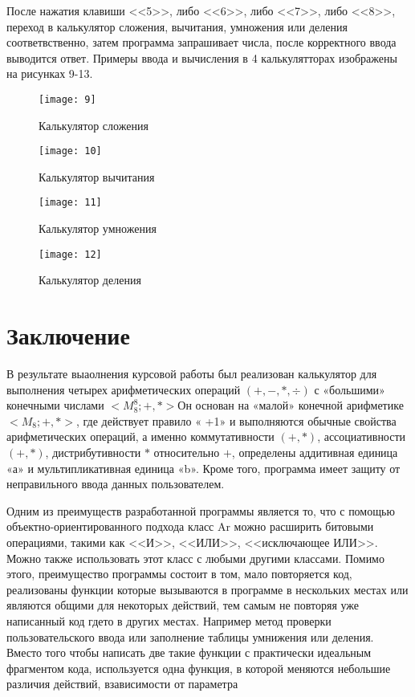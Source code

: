 \documentclass[10pt,a4paper,final]{article} %
\begin{document}
				После нажатия клавиши <<5>>, либо <<6>>, либо <<7>>, либо <<8>>, переход в калькулятор сложения, вычитания, умножения или деления соответвственно, затем программа запрашивает числа, после корректного ввода выводится ответ. Примеры ввода и вычисления в 4 калькулятторах изображены на рисунках 9-13.
			\begin{figure}[h!]
				\centering
				\texttt{[image: 9]}
				\caption{Калькулятор сложения}
					\texttt{[image: 10]}
				\caption{Калькулятор вычитания}
			\end{figure}	
			\newpage
			\begin{figure}[h!]
			\centering
			\texttt{[image: 11]}
			\caption{Калькулятор умножения}
				\texttt{[image: 12]}
			\caption{Калькулятор деления}
		\end{figure}	
		
		\newpage
		\section* {Заключение}
		
		
	
		


	
	В результате выаолнения курсовой работы был реализован калькулятор для выполнения четырех арифметических операций $(+, -, *, \div)$ с «большими» конечными числами $<M_{8}^{8} ;+, *>$Он основан на «малой» конечной арифметике $<M_{8};+, *>$, где действует правило « +1» и выполняются обычные свойства арифметических операций, а именно коммутативности $(+,*)$, ассоциативности $(+, *)$, дистрибутивности $*$ относительно $+$, определены аддитивная единица «а» и мультипликативная единица «b». Кроме того, программа имеет защиту от неправильного ввода данных пользователем.
	
	Одним из преимуществ разработанной программы является то, что с помощью объектно-ориентированного подхода класс Ar можно расширить битовыми операциями, такими как <<И>>, <<ИЛИ>>, <<исключающее ИЛИ>>. Можно также использовать этот класс с любыми другими классами. Помимо этого, преимущество программы состоит в том, мало повторяется код, реализованы функции которые вызываются в программе в нескольких местах или являются общими для некоторых действий, тем самым не повторяя уже написанный код гдето в других местах. Например метод проверки пользовательского ввода или заполнение таблицы умнижения или деления. Вместо того чтобы написать две такие функции с практически идеальным фрагментом кода, используется одна функция, в которой меняются небольшие различия действий, взависимости от параметра
	
\end{document}
